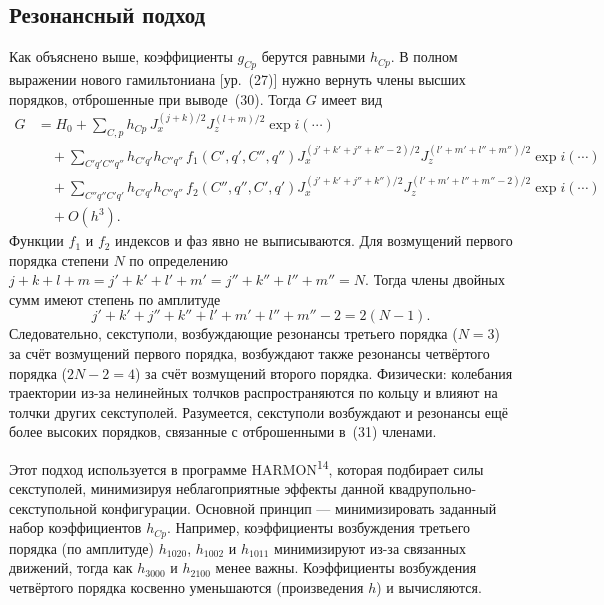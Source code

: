 \documentclass[11pt,a4paper]{article}
\begin{document}
\subsection{Резонансный подход}

Как объяснено выше, коэффициенты $g_{Cp}$ берутся равными $h_{Cp}$. В полном
выражении нового гамильтониана [ур.~(27)] нужно вернуть члены высших порядков,
отброшенные при выводе~(30). Тогда $G$ имеет вид
\begin{align}
G&=H_0+\sum_{C,p}h_{Cp}\,J_x^{(j+k)/2}J_z^{(l+m)/2}\exp i(\cdots)\nonumber\\
&\quad+\sum_{C'q'C''q''}h_{C'q'}h_{C''q''}\,f_1(C',q',C'',q'')
J_x^{(j'+k'+j''+k''-2)/2}J_z^{(l'+m'+l''+m'')/2}\exp i(\cdots)\nonumber\\
&\quad+\sum_{C''q''C'q'}h_{C'q'}h_{C''q''}\,f_2(C'',q'',C',q')
J_x^{(j'+k'+j''+k'')/2}J_z^{(l'+m'+l''+m''-2)/2}\exp i(\cdots)\nonumber\\
&\quad+O(h^3).
\end{align}
Функции $f_1$ и $f_2$ индексов и фаз явно не выписываются. Для возмущений первого
порядка степени $N$ по определению
$j+k+l+m=j'+k'+l'+m'=j''+k''+l''+m''=N$. Тогда члены двойных сумм имеют степень
по амплитуде
\begin{equation}
j'+k'+j''+k''+l'+m'+l''+m''-2=2(N-1).
\end{equation}
Следовательно, секступоли, возбуждающие резонансы третьего порядка ($N=3$) за
счёт возмущений первого порядка, возбуждают также резонансы четвёртого порядка
($2N-2=4$) за счёт возмущений второго порядка. Физически: колебания траектории
из-за нелинейных толчков распространяются по кольцу и влияют на толчки других
секступолей. Разумеется, секступоли возбуждают и резонансы ещё более высоких
порядков, связанные с отброшенными в~(31) членами.

Этот подход используется в программе HARMON\textsuperscript{14}, которая
подбирает силы секступолей, минимизируя неблагоприятные эффекты данной
квадрупольно-секступольной конфигурации. Основной принцип --- минимизировать
заданный набор коэффициентов $h_{Cp}$. Например, коэффициенты возбуждения
третьего порядка (по амплитуде) $h_{1020}$, $h_{1002}$ и $h_{1011}$ минимизируют
из-за связанных движений, тогда как $h_{3000}$ и $h_{2100}$ менее важны.
Коэффициенты возбуждения четвёртого порядка косвенно уменьшаются (произведения
$h$) и вычисляются.
\end{document}
